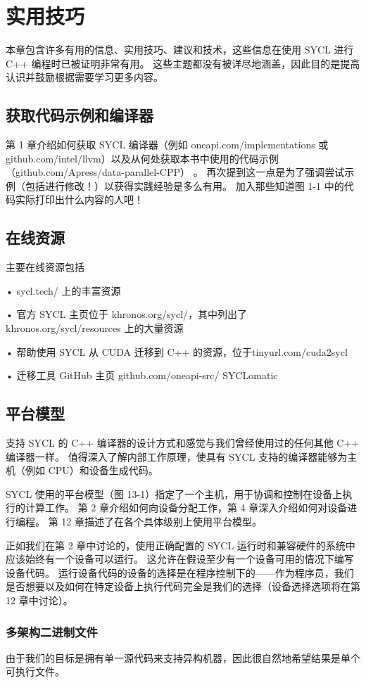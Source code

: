 \section{实用技巧}
本章包含许多有用的信息、实用技巧、建议和技术，这些信息在使用 SYCL 进行 C++ 编程时已被证明非常有用。 这些主题都没有被详尽地涵盖，因此目的是提高认识并鼓励根据需要学习更多内容。

\subsection{获取代码示例和编译器}
第 1 章介绍如何获取 SYCL 编译器（例如 oneapi.com/implementations 或 github.com/intel/llvm）以及从何处获取本书中使用的代码示例（github.com/Apress/data-parallel-CPP） 。 再次提到这一点是为了强调尝试示例（包括进行修改！）以获得实践经验是多么有用。 加入那些知道图 1-1 中的代码实际打印出什么内容的人吧！

\subsection{在线资源}
主要在线资源包括

• sycl.tech/ 上的丰富资源

• 官方 SYCL 主页位于 khronos.org/sycl/，其中列出了 khronos.org/sycl/resources 上的大量资源

• 帮助使用 SYCL 从 CUDA 迁移到 C++ 的资源，位于tinyurl.com/cuda2sycl

• 迁移工具 GitHub 主页 github.com/oneapi-src/ SYCLomatic

\subsection{平台模型}
支持 SYCL 的 C++ 编译器的设计方式和感觉与我们曾经使用过的任何其他 C++ 编译器一样。 值得深入了解内部工作原理，使具有 SYCL 支持的编译器能够为主机（例如 CPU）和设备生成代码。

SYCL 使用的平台模型（图 13-1）指定了一个主机，用于协调和控制在设备上执行的计算工作。 第 2 章介绍如何向设备分配工作，第 4 章深入介绍如何对设备进行编程。 第 12 章描述了在各个具体级别上使用平台模型。

正如我们在第 2 章中讨论的，使用正确配置的 SYCL 运行时和兼容硬件的系统中应该始终有一个设备可以运行。 这允许在假设至少有一个设备可用的情况下编写设备代码。 运行设备代码的设备的选择是在程序控制下的——作为程序员，我们是否想要以及如何在特定设备上执行代码完全是我们的选择（设备选择选项将在第 12 章中讨论）。

\subsubsection{多架构二进制文件}
由于我们的目标是拥有单一源代码来支持异构机器，因此很自然地希望结果是单个可执行文件。

